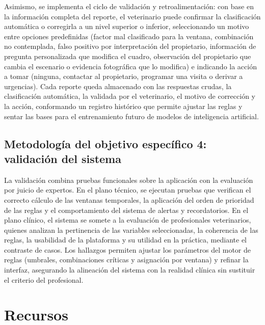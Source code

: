 \documentclass[stu, spanish]{apa7}
\begin{document}
Asimismo, se implementa el ciclo de validaci\'{o}n y retroalimentaci\'{o}n: con base en la informaci\'{o}n completa del reporte, el veterinario puede confirmar la clasificaci\'{o}n autom\'{a}tica o corregirla a un nivel superior o inferior, seleccionando un motivo entre opciones predefinidas (factor mal clasificado para la ventana, combinaci\'{o}n no contemplada, falso positivo por interpretaci\'{o}n del propietario, informaci\'{o}n de pregunta personalizada que modifica el cuadro, observaci\'{o}n del propietario que cambia el escenario o evidencia fotogr\'{a}fica que lo modifica) e indicando la acci\'{o}n a tomar (ninguna, contactar al propietario, programar una visita o derivar a urgencias). Cada reporte queda almacenado con las respuestas crudas, la clasificaci\'{o}n autom\'{a}tica, la validada por el veterinario, el motivo de correcci\'{o}n y la acci\'{o}n, conformando un registro hist\'{o}rico que permite ajustar las reglas y sentar las bases para el entrenamiento futuro de modelos de inteligencia artificial.

\subsection{Metodolog\'{i}a del objetivo espec\'{i}fico 4: validaci\'{o}n del sistema}
La validaci\'{o}n combina pruebas funcionales sobre la aplicaci\'{o}n con la evaluaci\'{o}n por juicio de expertos. En el plano t\'{e}cnico, se ejecutan pruebas que verifican el correcto c\'{a}lculo de las ventanas temporales, la aplicaci\'{o}n del orden de prioridad de las reglas y el comportamiento del sistema de alertas y recordatorios. En el plano cl\'{i}nico, el sistema se somete a la evaluaci\'{o}n de profesionales veterinarios, quienes analizan la pertinencia de las variables seleccionadas, la coherencia de las reglas, la usabilidad de la plataforma y su utilidad en la pr\'{a}ctica, mediante el contraste de casos. Los hallazgos permiten ajustar los par\'{a}metros del motor de reglas (umbrales, combinaciones cr\'{i}ticas y asignaci\'{o}n por ventana) y refinar la interfaz, asegurando la alineaci\'{o}n del sistema con la realidad cl\'{i}nica sin sustituir el criterio del profesional.

\section{Recursos}
\end{document}
